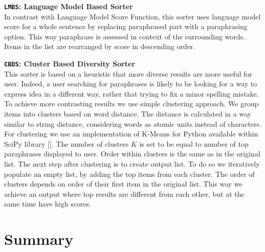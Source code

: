 \begin{flushleft}

\textbf{\texttt{LMBS}: \textbf{Language Model Based Sorter}} \\
In contrast with Language Model Score Function, this sorter uses language model score for a whole sentence by replacing paraphrased part with a paraphrasing option. This way paraphrase is assessed in context of the surrounding words. Items in the list are rearranged by score in descending order. 
\bigskip

\textbf{\texttt{CBDS}: \textbf{Cluster Based Diversity Sorter}} \\
This sorter is based on a heuristic that more diverse results are more useful for user. Indeed, a user searching for paraphrases is likely to be looking for a way to express idea in a different way, rather that trying to fix a minor spelling mistake. To achieve more contrasting results we use simple clustering approach. We group items into clusters based on word distance. The distance is calculated in a way similar to string distance, considering words as atomic units instead of characters. For clustering we use an implementation of K-Means for Python available within SciPy library []. The number of clusters $K$ is set to be equal to number of top paraphrases displayed to user. Order within clusters is the same as in the original list. The next step after clustering is to create output list. To do so we iteratively populate an empty list, by adding the top items from each cluster. The order of clusters depends on order of their first item in the original list. This way we achieve an output where top results are different from each other, but at the same time have high scores.
\bigskip

\end{flushleft}

\section{Summary}

